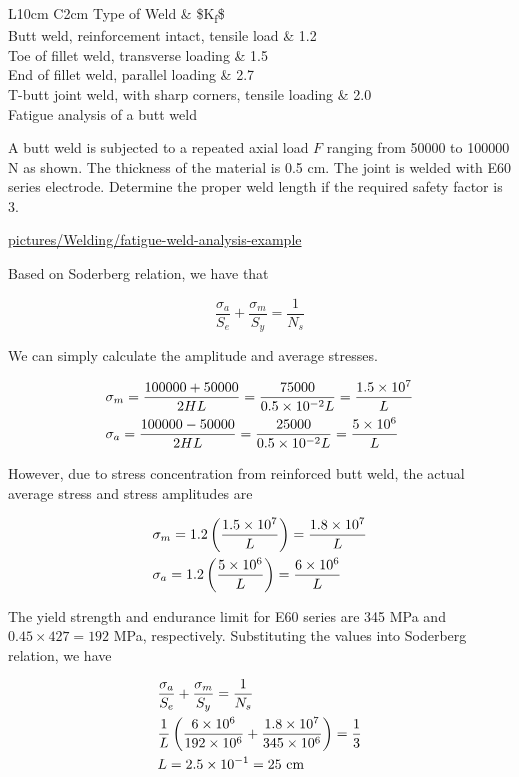 \documentclass[a4paper,openany,12pt]{book}
\begin{document}
{{ L10cm C2cm Type of Weld \& \$K\textsubscript{f}\$\\
Butt weld, reinforcement intact, tensile load \& 1.2\\
Toe of fillet weld, transverse loading \& 1.5\\
End of fillet weld, parallel loading \& 2.7\\
T-butt joint weld, with sharp corners, tensile loading \& 2.0\\

Fatigue analysis of a butt weld

A butt weld is subjected to a repeated axial load \(F\) ranging from 50000
to 100000 N as shown. The thickness of the material is 0.5 cm. The joint
is welded with E60 series electrode. Determine the proper weld length if
the required safety factor is 3.


\url{pictures/Welding/fatigue-weld-analysis-example}

Based on Soderberg relation, we have that

$$\frac{\sigma _a}{S_e} + \frac{\sigma _m}{S_y} = \frac{1}{N_s}$$

We can simply calculate the amplitude and average stresses.

$$\begin{gathered}
      \sigma_m = \frac{100000 + 50000}{2HL} = \frac{75000}{0.5 \times 10^{-2}L} = \frac{1.5 \times 10^7}{L} \hfill \\
      \sigma_a = \frac{100000 - 50000}{2HL} = \frac{25000}{0.5 \times 10^{-2}L} = \frac{5 \times 10^6}{L} \hfill \\ 
    \end{gathered}$$

However, due to stress concentration from reinforced butt weld, the
actual average stress and stress amplitudes are

$$\begin{gathered}
      \sigma_m = 1.2\left( \frac{1.5 \times 10^7}{L} \right) = \frac{1.8 \times 10^7}{L} \hfill \\
      \sigma_a = 1.2\left( \frac{5 \times 10^6}{L} \right) = \frac{6 \times 10^6}{L} \hfill \\ 
    \end{gathered}$$

The yield strength and endurance limit for E60 series are 345 MPa and
\(0.45 \times 427 = 192\) MPa, respectively. Substituting the values into
Soderberg relation, we have

$$\begin{gathered}
      \frac{\sigma_a}{S_e} + \frac{\sigma_m}{S_y} = \frac{1}{N_s} \hfill \\
      {1 \over L} \left( \frac{6 \times 10^6}{192 \times 10^6} + \frac{1.8 \times 10^7}{345 \times 10^6} \right) = \frac{1}{3} \hfill \\
      L = 2.5 \times {10^{-1}} = 25\text{ cm} \hfill \\ 
    \end{gathered}$$

}}
\end{document}
